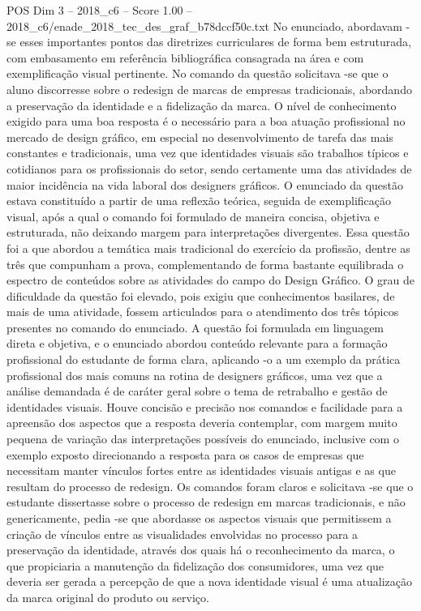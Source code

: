 \begin{textsample}{POS Dim 3 – 2018\_c6 – Score 1.00 – 2018\_c6/enade\_2018\_tec\_des\_graf\_b78dccf50c.txt}
No enunciado, abordavam -se esses importantes pontos das diretrizes curriculares de forma bem estruturada, com embasamento em referência bibliográfica consagrada na área e com exemplificação visual pertinente.
No comando da questão solicitava -se que o aluno discorresse sobre o redesign de marcas de empresas tradicionais, abordando a preservação da identidade e a fidelização da marca.
O nível de conhecimento exigido para uma boa resposta é o necessário para a boa atuação profissional no mercado de design gráfico, em especial no desenvolvimento de tarefa das mais constantes e tradicionais, uma vez que identidades visuais são trabalhos típicos e cotidianos para os profissionais do setor, sendo certamente uma das atividades de maior incidência na vida laboral dos designers gráficos.
O enunciado da questão estava constituído a partir de uma reflexão teórica, seguida de exemplificação visual, após a qual o comando foi formulado de maneira concisa, objetiva e estruturada, não deixando margem para interpretações divergentes.
Essa questão foi a que abordou a temática mais tradicional do exercício da profissão, dentre as três que compunham a prova, complementando de forma bastante equilibrada o espectro de conteúdos sobre as atividades do campo do Design Gráfico.
O grau de dificuldade da questão foi elevado, pois exigiu que conhecimentos basilares, de mais de uma atividade, fossem articulados para o atendimento dos três tópicos presentes no comando do enunciado.
A questão foi formulada em linguagem direta e objetiva, e o enunciado abordou conteúdo relevante para a formação profissional do estudante de forma clara, aplicando -o a um exemplo da prática profissional dos mais comuns na rotina de designers gráficos, uma vez que a análise demandada é de caráter geral sobre o tema de retrabalho e gestão de identidades visuais.
Houve concisão e precisão nos comandos e facilidade para a apreensão dos aspectos que a resposta deveria contemplar, com margem muito pequena de variação das interpretações possíveis do enunciado, inclusive com o exemplo exposto direcionando a resposta para os casos de empresas que necessitam manter vínculos fortes entre as identidades visuais antigas e as que resultam do processo de redesign.
Os comandos foram claros e solicitava -se que o estudante dissertasse sobre o processo de redesign em marcas tradicionais, e não genericamente, pedia -se que abordasse os aspectos visuais que permitissem a criação de vínculos entre as visualidades envolvidas no processo para a preservação da identidade, através dos quais há o reconhecimento da marca, o que propiciaria a manutenção da fidelização dos consumidores, uma vez que deveria ser gerada a percepção de que a nova identidade visual é uma atualização da marca original do produto ou serviço.

\end{textsample}

